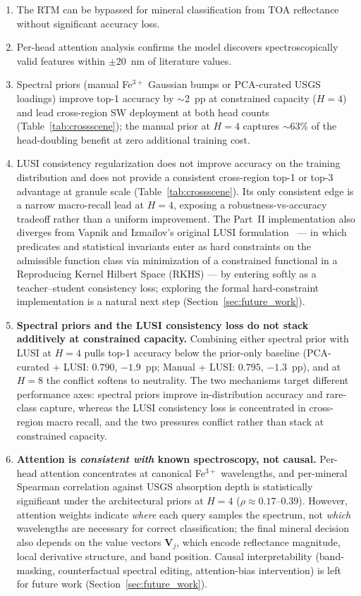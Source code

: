 \documentclass[11pt]{report}
\begin{document}
\begin{enumerate}
  \item The RTM can be bypassed for mineral classification from TOA reflectance without significant accuracy loss.
  \item Per-head attention analysis confirms the model discovers spectroscopically valid features within $\pm$20~nm of literature values.
  \item Spectral priors (manual Fe$^{3+}$ Gaussian bumps or PCA-curated USGS loadings) improve top-1 accuracy by $\sim$2~pp at constrained capacity ($H = 4$) and lead cross-region SW deployment at both head counts (Table~\ref{tab:crossscene}); the manual prior at $H = 4$ captures $\sim$63\% of the head-doubling benefit at zero additional training cost.
  \item LUSI consistency regularization does not improve accuracy on the training distribution and does not provide a consistent cross-region top-1 or top-3 advantage at granule scale (Table~\ref{tab:crossscene}). Its only consistent edge is a narrow macro-recall lead at $H = 4$, exposing a robustness-vs-accuracy tradeoff rather than a uniform improvement. The Part~II implementation also diverges from Vapnik and Izmailov's original LUSI formulation~\cite{vapnik2020} --- in which predicates and statistical invariants enter as hard constraints on the admissible function class via minimization of a constrained functional in a Reproducing Kernel Hilbert Space (RKHS) --- by entering softly as a teacher--student consistency loss; exploring the formal hard-constraint implementation is a natural next step (Section~\ref{sec:future_work}).
  \item \textbf{Spectral priors and the LUSI consistency loss do not stack additively at constrained capacity.} Combining either spectral prior with LUSI at $H = 4$ pulls top-1 accuracy below the prior-only baseline (PCA-curated + LUSI: $0.790$, $-1.9$~pp; Manual + LUSI: $0.795$, $-1.3$~pp), and at $H = 8$ the conflict softens to neutrality. The two mechanisms target different performance axes: spectral priors improve in-distribution accuracy and rare-class capture, whereas the LUSI consistency loss is concentrated in cross-region macro recall, and the two pressures conflict rather than stack at constrained capacity.
  \item \textbf{Attention is \emph{consistent with} known spectroscopy, not causal.} Per-head attention concentrates at canonical Fe$^{3+}$ wavelengths, and per-mineral Spearman correlation against USGS absorption depth is statistically significant under the architectural priors at $H = 4$ ($\rho \approx 0.17$--$0.39$). However, attention weights indicate \emph{where} each query samples the spectrum, not \emph{which} wavelengths are necessary for correct classification; the final mineral decision also depends on the value vectors $\mathbf{V}_j$, which encode reflectance magnitude, local derivative structure, and band position. Causal interpretability (band-masking, counterfactual spectral editing, attention-bias intervention) is left for future work (Section~\ref{sec:future_work}).

\end{enumerate}
\end{document}
